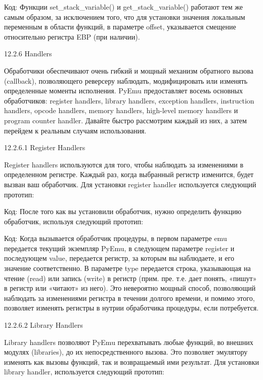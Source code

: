 \documentclass[12pt, a4paper, oneside]{book}
\begin{document}
Код:
Функции set\_stack\_variable() и get\_stack\_variable() работают тем же самым образом, за исключением того, что для установки значения локальным переменным в области функций, в параметре offset, указывается смещение относительно регистра EBP (при наличии).

12.2.6 Handlers

Обработчики обеспечивают очень гибкий и мощный механизм обратного вызова (callback), позволяющего реверсеру наблюдать, модифицировать или изменять определенные моменты исполнения. PyEmu предоставляет восемь основных обработчиков: register handlers, library handlers, exception handlers, instruction handlers, opcode handlers, memory handlers, high-level memory handlers и program counter handler. Давайте быстро рассмотрим каждый из них, а затем перейдем к реальным случаям использования.

12.2.6.1 Register Handlers

Register handlers используются для того, чтобы наблюдать за изменениями в определенном регистре. Каждый раз, когда выбранный регистр изменится, будет вызван ваш обработчик. Для установки register handler используется следующий прототип:

Код:
После того как вы установили обработчик, нужно определить функцию обработчик, используя следующий прототип:

Код:
Когда вызывается обработчик процедуры, в первом параметре emu передается текущий экземпляр PyEmu, в следующем параметре register и последующем value, передается регистр, за которым вы наблюдаете, и его значение соответственно. В параметре type передается строка, указывающая на чтение (read) или запись (write) в регистр (прим. пре. т.е. дает понять, «пишут» в регистр или «читают» из него). Это невероятно мощный способ, позволяющий наблюдать за изменениями регистра в течении долгого времени, и помимо этого, позволяет изменять регистры в нутрии обработчика процедуры, если потребуется.

12.2.6.2 Library Handlers

Library handlers позволяют PyEmu перехватывать любые функций, во внешних модулях (libraries), до их непосредственного вызова. Это позволяет эмулятору изменять как вызовы функций, так и возвращаемый ими результат. Для установки library handler, используется следующий прототип:
\end{document}
